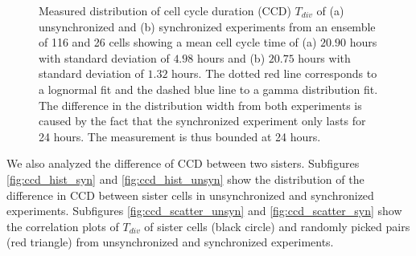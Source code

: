 \documentclass[pdftex,12pt,a4paper]{report}
\begin{document}
\begin{figure}[H]
\begin{subfigure}{.48\textwidth}
  \caption{}
  \label{fig:ccd_syn}
\end{subfigure}
\caption[Measured distribution of CCD in the synchronized and unsynchronized experiments]{Measured distribution of cell cycle duration (CCD) $T_{div}$ of (a) unsynchronized and (b) synchronized experiments from an ensemble of 116 and 26 cells showing a mean cell cycle time of (a) $20.90$ hours with standard deviation of $4.98$ hours and (b) $20.75$ hours with standard deviation of $1.32$ hours. The dotted red line corresponds to a lognormal fit and the dashed blue line to a gamma distribution fit. The difference in the distribution width from both experiments is caused by the fact that the synchronized experiment only lasts for 24 hours. The measurement is thus bounded at 24 hours.}
\label{fig:ccd_all}
\end{figure}

We also analyzed the difference of CCD between two sisters. Subfigures \ref{fig:ccd_hist_syn} and \ref{fig:ccd_hist_unsyn} show the distribution of the difference in CCD between sister cells in unsynchronized and synchronized experiments. Subfigures \ref{fig:ccd_scatter_unsyn} and \ref{fig:ccd_scatter_syn} show the correlation plots of $T_{div}$ of sister cells (black circle) and randomly picked pairs (red triangle) from unsynchronized and synchronized experiments.
\end{document}
